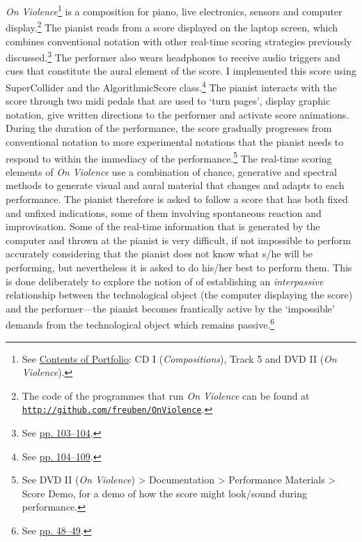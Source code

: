  \emph{On Violence}\footnote{See \hyperlink{portfolio}{Contents of Portfolio}: CD I (\emph{Compositions}), Track 5 and DVD II (\emph{On Violence}).} is a composition for piano, live electronics, sensors and computer display.\footnote{The code of the programmes that run \emph{On Violence} can be found at \href{http://github.com/freuben/OnViolence}{\texttt {http://github.com/freuben/OnViolence}}.} The pianist reads from a score displayed on the laptop screen, which combines conventional notation with other real-time scoring strategies previously discussed.\footnote{See \hyperlink{realtimescore}{pp. 103--104}.} The performer also wears headphones to receive audio triggers and cues that constitute the aural element of the score. I implemented this score using SuperCollider and the AlgorithmicScore class.\footnote{See \hyperlink{algoscore}{pp. 104--109}.} The pianist interacts with the score through two midi pedals that are used to `turn pages', display graphic notation, give written directions to the performer and activate score animations. During the duration of the performance, the score gradually progresses from conventional notation to more experimental notations that the pianist needs to respond to within the immediacy of the performance.\footnote{See DVD II (\emph{On Violence}) \tiny \textgreater \footnotesize \hspace{0pt} Documentation \tiny \textgreater \footnotesize \hspace{0pt} Performance Materials \tiny \textgreater \footnotesize \hspace{0pt} Score Demo, for a demo of how the score might look/sound during performance.} The real-time scoring elements of \emph{On Violence} use a combination of chance, generative and spectral methods to generate visual and aural material that changes and adapts to each performance. The pianist therefore is asked to follow a score that has both fixed and unfixed indications, some of them involving spontaneous reaction and improvisation. Some of the real-time information that is generated by the computer and thrown at the pianist is very difficult, if not impossible to perform accurately considering that the pianist does not know what s/he will be performing, but nevertheless it is asked to do his/her best to perform them. This is done deliberately to explore the notion of of establishing an \emph{interpassive} relationship between the technological object (the computer displaying the score) and the performer---the pianist becomes frantically active by the `impossible' demands from the technological object which remains passive.\footnote{See \hyperlink{zizekinterpassiv}{pp. 48--49}.}

